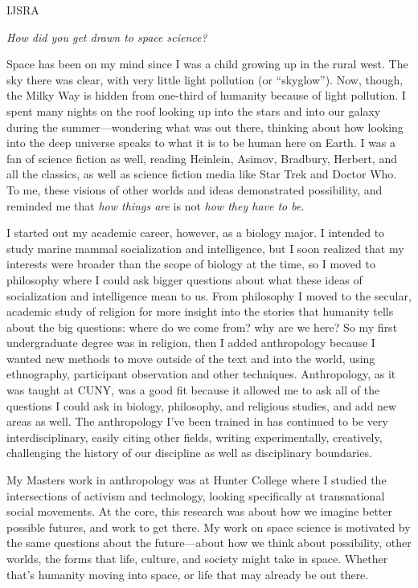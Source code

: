 \begin{labeling}{IJSRA}
	\item[IJSRA (International Journal of Student Research in Archaeology)] \emph{How did you get drawn to space science?}

	\item[Michael P. Oman-Reagan (MO-R)] Space has been on my mind since I was a child growing up in the rural west. The sky there was clear, with very little light pollution (or “skyglow”). Now, though, the Milky Way is hidden from one-third of humanity because of light pollution. I spent many nights on the roof looking up into the stars and into our galaxy during the summer—wondering what was out there, thinking about how looking into the deep universe speaks to what it is to be human here on Earth. I was a fan of science fiction as well, reading Heinlein, Asimov, Bradbury, Herbert, and all the classics, as well as science fiction media like Star Trek and Doctor Who. To me, these visions of other worlds and ideas demonstrated possibility, and reminded me that \emph{how things are} is not \emph{how they have to be}.

	I started out my academic career, however, as a biology major. I intended to study marine mammal socialization and intelligence, but I soon realized that my interests were broader than the scope of biology at the time, so I moved to philosophy where I could ask bigger questions about what these ideas of socialization and intelligence mean to us. From philosophy I moved to the secular, academic study of religion for more insight into the stories that humanity tells about the big questions: where do we come from? why are we here? So my first undergraduate degree was in religion, then I added anthropology because I wanted new methods to move outside of the text and into the world, using ethnography, participant observation and other techniques. Anthropology, as it was taught at CUNY, was a good fit because it allowed me to ask all of the questions I could ask in biology, philosophy, and religious studies, and add new areas as well. The anthropology I’ve been trained in has continued to be very interdisciplinary, easily citing other fields, writing experimentally, creatively, challenging the history of our discipline as well as disciplinary boundaries.

	My Masters work in anthropology was at Hunter College where I studied the intersections of activism and technology, looking specifically at transnational social movements. At the core, this research was about how we imagine better possible futures, and work to get there. My work on space science is motivated by the same questions about the future—about how we think about possibility, other worlds, the forms that life, culture, and society might take in space. Whether that’s humanity moving into space, or life that may already be out there.


\end{labeling}
